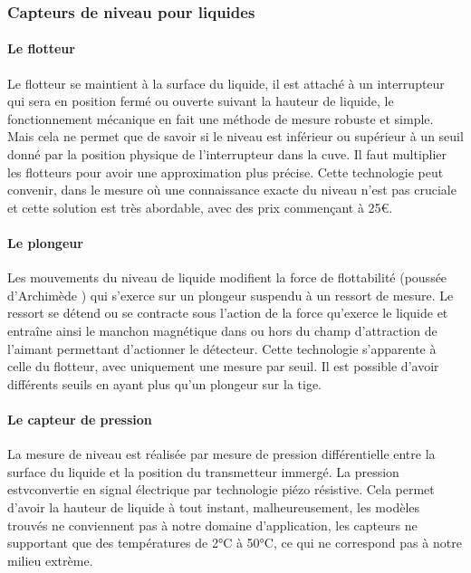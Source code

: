 \subsubsection{Capteurs de niveau pour liquides}

\paragraph{Le flotteur}

Le flotteur se maintient à la surface du liquide, il est attaché à un interrupteur qui sera en position fermé ou ouverte suivant la hauteur de liquide, le fonctionnement mécanique en fait une méthode de mesure robuste et simple. Mais cela ne permet que de savoir si le niveau est inférieur ou supérieur à un seuil donné par la position physique de l'interrupteur dans la cuve. Il faut multiplier les flotteurs pour avoir une approximation plus précise. Cette technologie peut convenir, dans le mesure où une connaissance exacte du niveau n'est pas cruciale et cette solution est très abordable, avec des prix commençant à 25\euro\footnotemark.


\paragraph{Le plongeur}

Les mouvements du niveau de liquide modifient la force de flottabilité (poussée d'Archimède ) qui s'exerce sur un plongeur suspendu à un ressort de mesure. Le ressort se détend ou se contracte sous l'action de la force qu'exerce le liquide et entraîne ainsi le manchon magnétique dans ou hors du champ d'attraction de l'aimant permettant d'actionner le détecteur. Cette technologie s'apparente à celle du flotteur, avec uniquement une mesure par seuil. Il est possible d'avoir différents seuils en ayant plus qu'un plongeur sur la tige.

\paragraph{Le capteur de pression}

La mesure de niveau est réalisée par mesure de pression différentielle entre la surface du liquide et la position du transmetteur immergé. La pression estvconvertie en signal électrique par technologie piézo résistive. Cela permet d'avoir la hauteur de liquide à tout instant, malheureusement, les modèles trouvés ne conviennent pas à notre domaine d'application, les capteurs ne supportant que des températures de 2°C à 50°C, ce qui ne correspond pas à notre milieu extrème.

